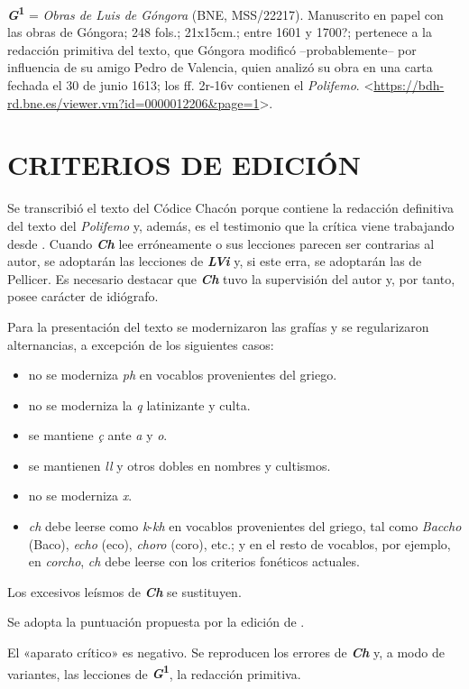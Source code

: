 \documentclass[11pt,twoside]{article}
\newcommand{\ch}{\emph{\textbf{Ch}}}
\newcommand{\guno}{\textbf{\emph{G}\textsuperscript{1}}}
\newcommand{\lvi}{\emph{\textbf{LVi}}}
\begin{document}
%
{\guno} = \emph{Obras de Luis de Góngora} (BNE, MSS/22217).
%
Manuscrito en papel con las obras de Góngora; 248 fols.; 21x15cm.; entre 1601 y 1700?; pertenece a la redacción primitiva del texto, que Góngora modificó --probablemente-- por influencia de su amigo Pedro de Valencia, quien analizó su obra en una carta fechada el 30 de junio 1613; los ff. 2r-16v contienen el \emph{Polifemo}. <\url{https://bdh-rd.bne.es/viewer.vm?id=0000012206\&page=1}>.\par
%
\section*{\raggedleft\textsc{CRITERIOS DE EDICIÓN}}
%
\noindent Se transcribió el texto del Códice Chacón porque contiene la redacción definitiva del texto del \emph{Polifemo} y, además, es el testimonio que la crítica viene trabajando desde \textcite{Fouché-Delbosc1900}. Cuando {\ch} lee erróneamente o sus lecciones parecen ser contrarias al autor, se adoptarán las lecciones de {\lvi} y, si este erra, se adoptarán las de Pellicer. Es necesario destacar que {\ch} tuvo la supervisión del autor y, por tanto, posee carácter de idiógrafo.\par
%
Para la presentación del texto se modernizaron las grafías y se regula\-rizaron alternancias, a excepción de los siguientes casos:
%
\begin{itemize}[label=--]%
\item no se moderniza \emph{ph} en vocablos provenientes del griego.
\item no se moderniza la \emph{q} latinizante y culta.
\item se mantiene \emph{ç} ante \emph{a} y \emph{o}. 
\item se mantienen \emph{ll} y otros dobles en nombres y cultismos.
\item no se moderniza \emph{x}.
\item \emph{ch} debe leerse como \emph{k}-\emph{kh} en vocablos provenientes del griego, tal como \emph{Baccho} (Baco), \emph{echo} (eco), \emph{choro} (coro), etc.; y en el resto de vocablos, por ejemplo, en \emph{corcho}, \emph{ch} debe leerse con los criterios fonéticos actuales.
\end{itemize}\par
%
Los excesivos leísmos de {\ch} se sustituyen.\par
%
Se adopta la puntuación propuesta por la edición de \textcite{Alonso1967}.\par
%
El «aparato crítico» es negativo. Se reproducen los errores de {\ch} y, a modo de variantes, las lecciones de {\guno}, la redacción primitiva.\par
%
\end{document}
